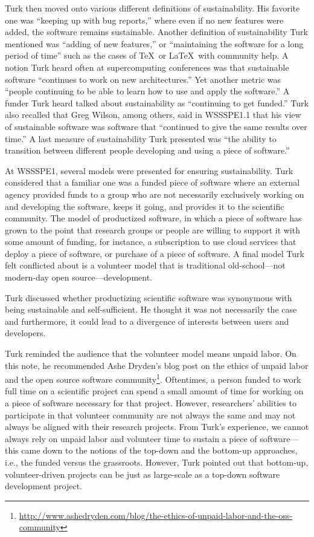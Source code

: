 \documentclass[11pt, oneside]{amsart}
\begin{document}
Turk then moved onto various different definitions of sustainability. His
favorite one was ``keeping up with bug reports,'' where even if no new features
were added, the software remains sustainable. Another definition of
sustainability Turk mentioned was ``adding of new features,'' or ``maintaining
the software for a long period of time'' such as the cases of \TeX\ or \LaTeX\
with community help. A notion Turk heard often at supercomputing conferences was
that sustainable software ``continues to work on new architectures.'' Yet
another metric was ``people continuing to be able to learn how to use and apply
the software.'' A funder Turk heard talked about sustainability as ``continuing
to get funded.'' Turk also recalled that Greg Wilson, among others, said in
WSSSPE1.1 that his view of sustainable software was software that ``continued to
give the same results over time.'' A last measure of sustainability Turk
presented was ``the ability to transition between different people developing
and using a piece of software.''

At WSSSPE1, several models were presented for ensuring sustainability. Turk
considered that a familiar one was a funded piece of software where an external
agency provided funds to a group who are not necessarily exclusively working on
and developing the software, keeps it going, and provides it to the scientific
community. The model of productized software, in which a piece of software has
grown to the point that research groups or people are willing to support it with
some amount of funding, for instance, a subscription to use cloud services that
deploy a piece of software, or purchase of a piece of software. A final model
Turk felt conflicted about is a volunteer model that is traditional
old-school---not modern-day open source---development.

Turk discussed whether productizing scientific software was synonymous with
being sustainable and self-sufficient. He thought it was not necessarily the
case and furthermore, it could lead to a divergence of interests between users
and developers.

Turk reminded the audience that the volunteer model means unpaid labor. On this
note, he recommended Ashe Dryden's blog post on the ethics of unpaid labor and
the open source software
community\footnote{\url{http://www.ashedryden.com/blog/the-ethics-of-unpaid-labor-and-the-oss-community}}.
Oftentimes, a person funded to work full time on a scientific project can spend
a small amount of time for working on a piece of software necessary for that
project. However, researchers' abilities to participate in that volunteer
community are not always the same and may not always be aligned with their
research projects. From Turk's experience, we cannot always rely on unpaid labor
and volunteer time to sustain a piece of software---this came down to the
notions of the top-down and the bottom-up approaches, i.e., the funded versus
the grassroots. However, Turk pointed out that bottom-up, volunteer-driven
projects can be just as large-scale as a top-down software development project.
\end{document}
